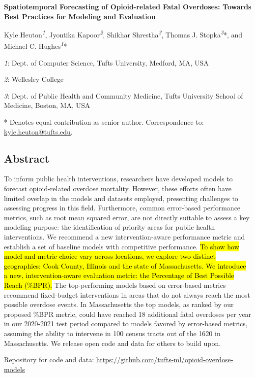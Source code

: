 \textbf{Spatiotemporal Forecasting of Opioid-related Fatal Overdoses: Towards Best Practices for Modeling and Evaluation}

Kyle Heuton\emph{\textsuperscript{1}}, Jyontika Kapoor\emph{\textsuperscript{2}}, Shikhar Shrestha\emph{\textsuperscript{3}}, Thomas J. Stopka\emph{\textsuperscript{3}}*, and Michael C. Hughes\emph{\textsuperscript{1}}*

\emph{1}: Dept. of Computer Science, Tufts University, Medford, MA, USA

\emph{2}: Wellesley College

\emph{3}: Dept. of Public Health and Community Medicine, Tufts University School of Medicine, Boston, MA, USA

* Denotes equal contribution as senior author. Correspondence to: \href{mailto:kyle.heuton@tufts.edu}{\ul{kyle.heuton@tufts.edu}}.

\subsection{Abstract}\label{abstract}

To inform public health interventions, researchers have developed models to forecast opioid-related overdose mortality. However, these efforts often have limited overlap in the models and datasets employed, presenting challenges to assessing progress in this field. Furthermore, common error-based performance metrics, such as root mean squared error, are not directly suitable to assess a key modeling purpose: the identification of priority areas for public health interventions. We recommend a new intervention-aware performance metric and establish a set of baseline models with competitive performance. \hl{To show how model and metric choice vary across locations, we explore two distinct geographies: Cook County, Illinois and the state of Massachusetts. We introduce a new, intervention-aware evaluation metric: the Percentage of Best Possible Reach (\%BPR).} The top-performing models based on error-based metrics recommend fixed-budget interventions in areas that do not always reach the most possible overdose events. In Massachusetts the top models, as ranked by our proposed \%BPR metric, could have reached 18 additional fatal overdoses per year in our 2020-2021 test period compared to models favored by error-based metrics, assuming the ability to intervene in 100 census tracts out of the 1620 in Massachusetts. We release open code and data for others to build upon.

Repository for code and data: \href{https://github.com/tufts-ml/opioid-overdose-models}{\ul{https://github.com/tufts-ml/opioid-overdose-models}}

